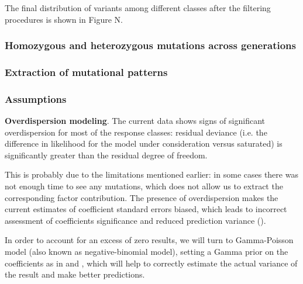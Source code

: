 The final distribution of variants among different classes after the filtering procedures is shown in Figure N.




\subsubsection{Homozygous and heterozygous mutations across generations}







\subsubsection{Extraction of mutational patterns}


\subsubsection*{Assumptions}

\textbf{Overdispersion modeling}. The current data shows signs of significant overdispersion for most of the response classes: residual deviance (i.e. the difference in likelihood for the model under consideration versus saturated) is significantly greater than the residual degree of freedom.



This is probably due to the limitations mentioned earlier: in some cases there was not enough time to see any mutations, which does not allow us to extract the corresponding factor contribution. The presence of overdispersion makes the current estimates of coefficient standard errors biased, which leads to incorrect assessment of coefficients significance and reduced prediction variance (\cite{overdisp}).

In order to account for an excess of zero results, we will turn to Gamma-Poisson model (also known as negative-binomial model), setting a Gamma prior on the coefficients as in \cite{Ivek} and \cite{BNB}, which will help to correctly estimate the actual variance of the result and make better predictions.

